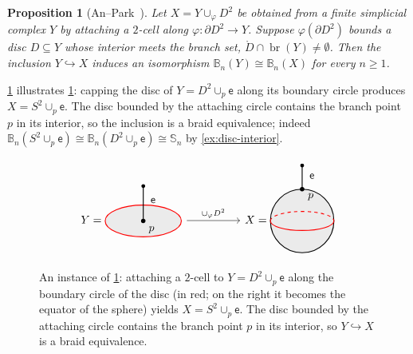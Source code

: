 \documentclass[reqno]{amsart}
\newtheorem{proposition}[theorem]{Proposition}
\theoremstyle{definition}
\newcommand{\BG}{\mathbb{B}}
\numberwithin{equation}{section}
\begin{document}
\begin{proposition}[{An--Park~\cite[Cor.~3.9]{AnPark2017}}]
\label{prop:reduce-2-cell}
Let \(X=Y\cup_\varphi D^2\) be obtained from a finite simplicial
complex \(Y\) by attaching a \(2\)-cell along
\(\varphi\colon\partial D^2\to Y\). Suppose \(\varphi(\partial D^2)\)
bounds a disc \(D\subseteq Y\) whose interior meets the
branch set, \(\mathring D\cap\operatorname{br}(Y)\neq\emptyset\). Then
the inclusion \(Y\hookrightarrow X\) induces an isomorphism \(\BG_n(Y)\cong\BG_n(X)\) for every \(n\geq 1\).
\end{proposition}

\cref{fig:reduce-2-cell} illustrates
\cref{prop:reduce-2-cell}: capping the disc of
\(Y=D^2\cup_p\mathsf{e}\) along its boundary circle produces
\(X=S^2\cup_p\mathsf{e}\). The disc bounded by the attaching
circle contains the branch point \(p\) in its interior, so the
inclusion is a braid equivalence; indeed
\(\BG_n(S^2\cup_p\mathsf{e})\cong
\BG_n(D^2\cup_p\mathsf{e})\cong\mathbb{S}_n\) by
\cref{ex:disc-interior}.

\begin{figure}[ht]
\centering
\[
\begin{tikzcd}[column sep=4pc]
Y=\begin{tikzpicture}[baseline=-.5ex,line width=0.8pt]
  \fill[gray!30,opacity=0.5] (0,0) ellipse (1.2 and 0.5);
  \draw[red] (0,0) ellipse (1.2 and 0.5);
  \draw (0,0) -- (0,1.1);
  \filldraw (0,1.1) circle (1.3pt);
  \node[right=1pt] at (0.03,0.65) {\(\mathsf{e}\)};
  \filldraw (0,0) circle (1.6pt);
  \node[below right=-1pt] at (0.04,-0.06) {\(p\)};
\end{tikzpicture}\ar[r,"\cup_\varphi D^2"]&
X=\begin{tikzpicture}[baseline=-.5ex,line width=0.8pt]
  \fill[gray!30,opacity=0.5] (0,0) circle (1.0);
  \draw (0,0) circle (1.0);
  \draw[red] (-1,0) arc (180:360:1 and 0.3);
  \draw[red, dashed] (-1,0) arc (180:0:1 and 0.3);
  \draw (0,1.0) -- (0,1.75);
  \filldraw (0,1.75) circle (1.3pt);
  \node[right=1pt] at (0.03,1.42) {\(\mathsf{e}\)};
  \filldraw (0,1.0) circle (1.6pt);
  \node[below right=-1pt] at (0.05,0.98) {\(p\)};
\end{tikzpicture}
\end{tikzcd}
\]
\caption{An instance of \cref{prop:reduce-2-cell}: attaching a
\(2\)-cell to \(Y=D^2\cup_p\mathsf{e}\) along the boundary
circle of the disc (in red; on the right it becomes the equator
of the sphere) yields \(X=S^2\cup_p\mathsf{e}\). The disc
bounded by the attaching circle contains the branch point \(p\)
in its interior, so \(Y\hookrightarrow X\) is a braid
equivalence.}
\label{fig:reduce-2-cell}
\end{figure}
\end{document}
